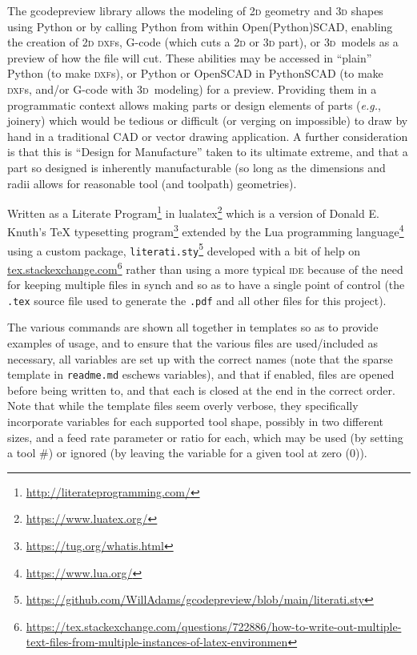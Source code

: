 \documentclass{ltxdoc}
\begin{document}
The gcodepreview library allows the modeling of \textsc{2d} geometry and \textsc{3d} shapes using Python or by calling Python from within Open(Python)SCAD, enabling the creation of \textsc{2d} \textsc{dxf}s, G-code (which cuts a \textsc{2d} or \textsc{3d} part), or \textsc{3d}~models as a preview of how the file will cut. These abilities may be accessed in ``plain'' Python (to make \textsc{dxf}s), or Python or OpenSCAD in PythonSCAD (to make \textsc{dxf}s, and/or G-code with \textsc{3d}~modeling) for a preview. Providing them in a programmatic context allows making parts or design elements of parts (\emph{e.g.}, joinery) which would be tedious or difficult (or verging on impossible) to draw by hand in a traditional CAD or vector drawing application. A further consideration is that this is ``Design for Manufacture'' taken to its ultimate extreme, and that a part so designed is inherently manufacturable (so long as the dimensions and radii allows for reasonable tool (and toolpath) geometries).

Written as a Literate Program\footnote{\url{http://literateprogramming.com/}} in lualatex\footnote{\url{https://www.luatex.org/}} which is a version of Donald E. Knuth's TeX typesetting program\footnote{\url{https://tug.org/whatis.html}} extended by the Lua programming language\footnote{\url{https://www.lua.org/}} using a custom package, \verb|literati.sty|\footnote{\url{https://github.com/WillAdams/gcodepreview/blob/main/literati.sty}} developed with a bit of help on \url{tex.stackexchange.com}\footnote{\url{https://tex.stackexchange.com/questions/722886/how-to-write-out-multiple-text-files-from-multiple-instances-of-latex-environmen}} rather than using a more typical \textsc{ide} because of the need for keeping multiple files in synch and so as to have a single point of control (the \verb|.tex| source file used to generate the \verb|.pdf| and all other files for this project).

The various commands are shown all together in templates so as to provide examples of usage, and to ensure that the various files are used/included as necessary, all variables are set up with the correct names (note that the sparse template in \verb|readme.md| eschews variables), and that if enabled, files are opened before being written to, and that each is closed at the end in the correct order. Note that while the template files seem overly verbose, they specifically incorporate variables for each supported tool shape, possibly in two different sizes, and a feed rate parameter or ratio for each, which may be used (by setting a tool \#) or ignored (by leaving the variable for a given tool at zero (0)). 
\end{document}
